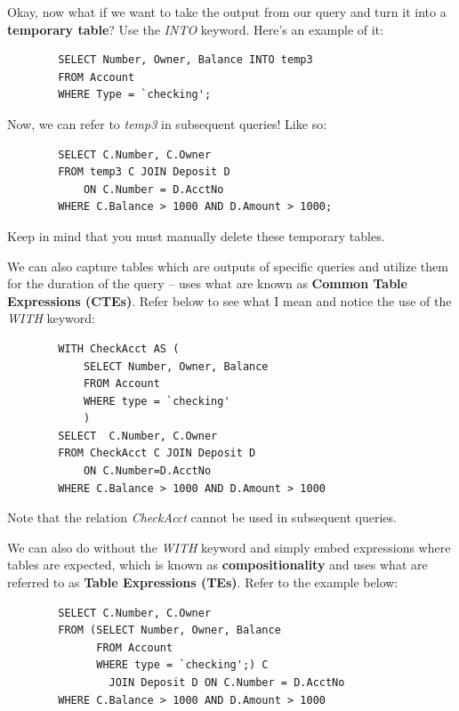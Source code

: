 \documentclass{article}
\begin{document}
Okay, now what if we want to take the output from our query and turn it into a \textbf{temporary table}? Use the \textit{INTO} keyword. Here's an example of it:

\begin{tcolorbox}
    \begin{verbatim}
        SELECT Number, Owner, Balance INTO temp3
        FROM Account
        WHERE Type = `checking';
    \end{verbatim}
\end{tcolorbox}

Now, we can refer to \textit{temp3} in subsequent queries! Like so:

\begin{tcolorbox}
    \begin{verbatim}
        SELECT C.Number, C.Owner
        FROM temp3 C JOIN Deposit D
            ON C.Number = D.AcctNo
        WHERE C.Balance > 1000 AND D.Amount > 1000;
    \end{verbatim}
\end{tcolorbox}

Keep in mind that you must manually delete these temporary tables.

We can also capture tables which are outputs of specific queries and utilize them for the duration of the query -- uses what are known as \textbf{Common Table Expressions (CTEs)}. Refer below to see what I mean and notice the use of the \textit{WITH} keyword:

\begin{tcolorbox}
    \begin{verbatim}
        WITH CheckAcct AS (
            SELECT Number, Owner, Balance
            FROM Account
            WHERE type = `checking'
            )
        SELECT  C.Number, C.Owner
        FROM CheckAcct C JOIN Deposit D
            ON C.Number=D.AcctNo
        WHERE C.Balance > 1000 AND D.Amount > 1000
    \end{verbatim}
\end{tcolorbox}
Note that the relation \textit{CheckAcct} cannot be used in subsequent queries.

We can also do without the \textit{WITH} keyword and simply embed expressions where tables are expected, which is known as \textbf{compositionality} and uses what are referred to as \textbf{Table Expressions (TEs)}. Refer to the example below:

\begin{tcolorbox}
    \begin{verbatim}
        SELECT C.Number, C.Owner
        FROM (SELECT Number, Owner, Balance
              FROM Account
              WHERE type = `checking';) C
                JOIN Deposit D ON C.Number = D.AcctNo
        WHERE C.Balance > 1000 AND D.Amount > 1000
    \end{verbatim}
\end{tcolorbox}
\end{document}
